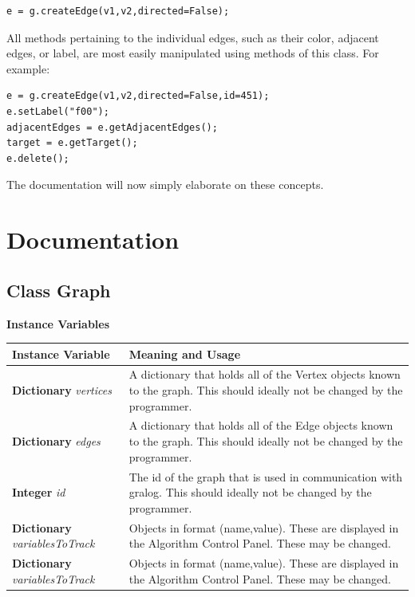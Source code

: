 \documentclass{article}
\newcounter{example}
\newlength\q
\begin{document}
\begin{lstlisting}
e = g.createEdge(v1,v2,directed=False);
\end{lstlisting}

All methods pertaining to the individual edges, such as their color, adjacent edges, or label, are most easily manipulated using methods of this class. For example:

\begin{lstlisting}
e = g.createEdge(v1,v2,directed=False,id=451);
e.setLabel("f00");
adjacentEdges = e.getAdjacentEdges();
target = e.getTarget();
e.delete();
\end{lstlisting}

The documentation will now simply elaborate on these concepts.

\section{Documentation}

\subsection{Class Graph}

\textbf{{\large Instance Variables}}


\begin{longtable}{p{\q}p{\q}}
Instance Variable & Meaning and Usage \\ \hline
\textbf{Dictionary} \textit{vertices} & A dictionary that holds all of the Vertex objects known to the graph. This should ideally not be changed by the programmer. \\\hline
\textbf{Dictionary} \textit{edges} & A dictionary that holds all of the Edge objects known to the graph. This should ideally not be changed by the programmer. \\\hline
\textbf{Integer} \textit{id} & The id of the graph that is used in communication with gralog. This should ideally not be changed by the programmer. \\ \hline
\textbf{Dictionary} \textit{variablesToTrack} & Objects in format (name,value). These are displayed in the Algorithm Control Panel. These may be changed. \\ \hline
\textbf{Dictionary} \textit{variablesToTrack} & Objects in format (name,value). These are displayed in the Algorithm Control Panel. These may be changed. \\ \hline
\end{longtable}
\end{document}

